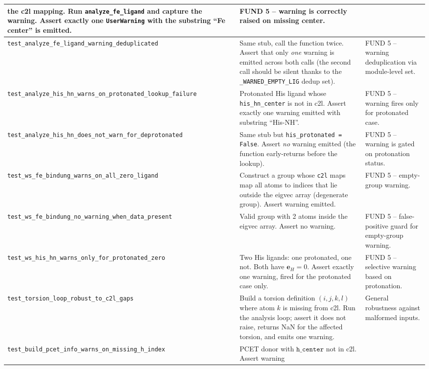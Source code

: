 \documentclass[10pt,a4paper,twoside]{article}
\newcommand{\evec}{\mathbf{e}}
\newcommand{\fn}[1]{\texttt{#1}}
\begin{document}
\begin{longtable}{p{} p{} p{}}
   the c2l mapping. Run \fn{analyze\_fe\_ligand} and capture the
   warning. Assert exactly one \fn{UserWarning} with the substring
   ``Fe center'' is emitted.
 & FUND 5 -- warning is correctly raised on missing center. \\
\midrule
\texttt{test\_analyze\_fe\_ligand\_warning\_deduplicated}
 & Same stub, call the function twice. Assert that only
   \emph{one} warning is emitted across both calls (the second
   call should be silent thanks to the
   \fn{\_WARNED\_EMPTY\_LIG} dedup set).
 & FUND 5 -- warning deduplication via module-level set. \\
\midrule
\texttt{test\_analyze\_his\_hn\_warns\_on\_protonated\_lookup\_failure}
 & Protonated His ligand whose \texttt{his\_hn\_center} is not in
   c2l. Assert exactly one warning emitted with substring ``His-NH''.
 & FUND 5 -- warning fires only for protonated case. \\
\midrule
\texttt{test\_analyze\_his\_hn\_does\_not\_warn\_for\_deprotonated}
 & Same stub but \texttt{his\_protonated = False}. Assert
   \emph{no} warning emitted (the function early-returns before
   the lookup).
 & FUND 5 -- warning is gated on protonation status. \\
\midrule
\texttt{test\_ws\_fe\_bindung\_warns\_on\_all\_zero\_ligand}
 & Construct a group whose \texttt{c2l} maps map all atoms to
   indices that lie outside the eigvec array (degenerate group).
   Assert warning emitted.
 & FUND 5 -- empty-group warning. \\
\midrule
\texttt{test\_ws\_fe\_bindung\_no\_warning\_when\_data\_present}
 & Valid group with 2 atoms inside the eigvec array. Assert no
   warning.
 & FUND 5 -- false-positive guard for empty-group warning. \\
\midrule
\texttt{test\_ws\_his\_hn\_warns\_only\_for\_protonated\_zero}
 & Two His ligands: one protonated, one not. Both have
   $\evec_H = 0$. Assert exactly one warning, fired for the
   protonated case only.
 & FUND 5 -- selective warning based on protonation. \\
\midrule
\texttt{test\_torsion\_loop\_robust\_to\_c2l\_gaps}
 & Build a torsion definition $(i, j, k, l)$ where atom $k$ is
   missing from c2l. Run the analysis loop; assert it does not
   raise, returns NaN for the affected torsion, and emits one
   warning.
 & General robustness against malformed inputs. \\
\midrule
\texttt{test\_build\_pcet\_info\_warns\_on\_missing\_h\_index}
 & PCET donor with $\texttt{h\_center}$ not in c2l. Assert warning

\end{longtable}
\end{document}
